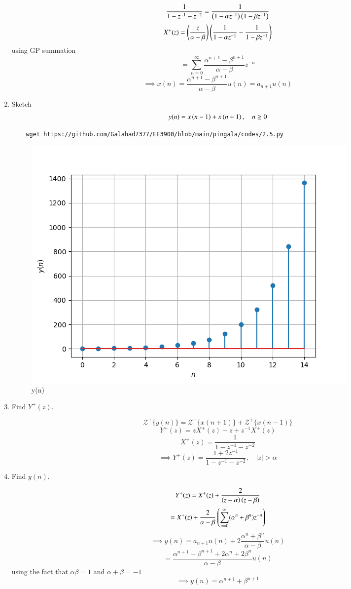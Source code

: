 \documentclass[journal,12pt,twocolumn]{IEEEtran}
\renewcommand\thesection{\arabic{section}}
\begin{document}
\begin{enumerate}[label=\thesection.\arabic*,ref=\thesection.\theenumi]
\solution
\[\frac{1}{1-z^{-1}-z^{-2}} = \frac{1}{\left(1-\alpha z^{-1}\right) \left(1-\beta z^{-1}\right)}\]
\[ X^{+}(z) = \left(\frac{z}{\alpha-\beta}\right)\left(\frac{1}{1-\alpha z^{-1}} - \frac{1}{1-\beta z^{-1}} \right)\]
using GP summation
\[=\sum_{n=0}^\infty \frac{\alpha^{n+1}-\beta^{n+1}}{\alpha-\beta}z^{-n}\]
\[\implies x(n) = \frac{\alpha^{n+1}-\beta^{n+1}}{\alpha-\beta} u(n) = a_{n+1}u(n)\]

	\item Sketch 
\begin{align}
	y(n)	 = x\left(n-1\right) + x\left(n+1\right),  \quad n \ge 0
	\label{eq:10-orig-diff-rev}
\end{align}
\solution
\begin{lstlisting}
    wget https://github.com/Galahad7377/EE3900/blob/main/pingala/codes/2.5.py
\end{lstlisting}
\begin{figure}[!ht]
    \centering
    \includegraphics[width=\columnwidth]{figs/2.5.png}
    \caption{y(n)}
    \label{fig:yn}
\end{figure}

\item Find $Y^{+}(z)$. 

\solution
\[\mathcal{Z}^+\{y(n)\} = \mathcal{Z}^+\{x(n+1)\}+\mathcal{Z}^+\{x(n-1)\}\]
\[Y^+(z) = zX^+(z)-z+z^{-1}X^+(z)\]
\[X^{+}(z) = \frac{1}{1-z^{-1}-z^{-2}}\]
\[\implies Y^+(z) = \frac{1+2z^{-1}}{1-z^{-1}-z^{-2}}, \quad |z| > \alpha\]
\item Find $y(n)$.

\solution
\[Y^+(z) = X^+(z) + \frac{2}{\left(z-\alpha\right)\left(z-\beta\right)}\]
\[= X^+(z) +\frac{2}{\alpha-\beta}\left(\sum_{n=0}^{\infty} (\alpha^n+\beta^n)z^{-n}\right)\]
\[ \implies y(n) = a_{n+1}u(n) + 2\frac{\alpha^n+\beta^n}{\alpha-\beta}u(n)\]
\[ = \frac{\alpha^{n+1} - \beta^{n+1}+2\alpha^n+2\beta^{n}}{\alpha-\beta}u(n)\]
using the fact that $\alpha\beta = 1$ and $\alpha + \beta = -1$
\[\implies y(n) = \alpha^{n+1}+\beta^{n+1}\]
\end{enumerate}
\end{document}
